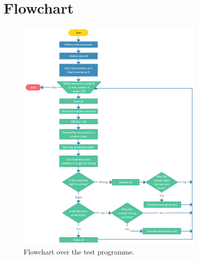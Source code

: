 \chapter{Flowchart}
\label{app:Flowchart}

\begin{figure}[H]
	\centering
	\includegraphics[resolution=300,width=0.8\textwidth]{Figure/Flowchart}
	\caption{Flowchart over the test programme.}
	\label{fig:Flowchart}
\end{figure}
\noindent

